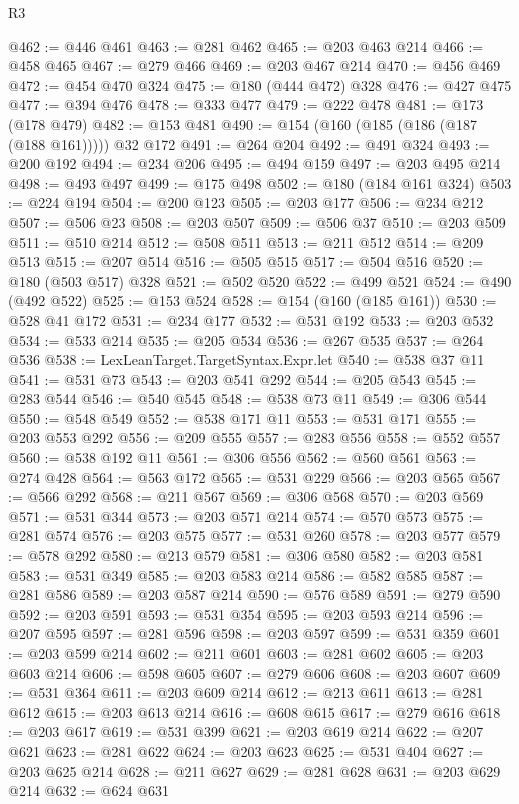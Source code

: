\begin{lexlean}{R3}
\begin{coremodule}
@462 := @446 @461
@463 := @281 @462
@465 := @203 @463 @214
@466 := @458 @465
@467 := @279 @466
@469 := @203 @467 @214
@470 := @456 @469
@472 := @454 @470 @324
@475 := @180 (@444 @472) @328
@476 := @427 @475
@477 := @394 @476
@478 := @333 @477
@479 := @222 @478
@481 := @173 (@178 @479)
@482 := @153 @481
@490 := @154 (@160 (@185 (@186 (@187 (@188 @161))))) @32 @172
@491 := @264 @204
@492 := @491 @324
@493 := @200 @192
@494 := @234 @206
@495 := @494 @159
@497 := @203 @495 @214
@498 := @493 @497
@499 := @175 @498
@502 := @180 (@184 @161 @324)
@503 := @224 @194
@504 := @200 @123
@505 := @203 @177
@506 := @234 @212
@507 := @506 @23
@508 := @203 @507
@509 := @506 @37
@510 := @203 @509
@511 := @510 @214
@512 := @508 @511
@513 := @211 @512
@514 := @209 @513
@515 := @207 @514
@516 := @505 @515
@517 := @504 @516
@520 := @180 (@503 @517) @328
@521 := @502 @520
@522 := @499 @521
@524 := @490 (@492 @522)
@525 := @153 @524
@528 := @154 (@160 (@185 @161))
@530 := @528 @41 @172
@531 := @234 @177
@532 := @531 @192
@533 := @203 @532
@534 := @533 @214
@535 := @205 @534
@536 := @267 @535
@537 := @264 @536
@538 := LexLeanTarget.TargetSyntax.Expr.let
@540 := @538 @37 @11
@541 := @531 @73
@543 := @203 @541 @292
@544 := @205 @543
@545 := @283 @544
@546 := @540 @545
@548 := @538 @73 @11
@549 := @306 @544
@550 := @548 @549
@552 := @538 @171 @11
@553 := @531 @171
@555 := @203 @553 @292
@556 := @209 @555
@557 := @283 @556
@558 := @552 @557
@560 := @538 @192 @11
@561 := @306 @556
@562 := @560 @561
@563 := @274 @428
@564 := @563 @172
@565 := @531 @229
@566 := @203 @565
@567 := @566 @292
@568 := @211 @567
@569 := @306 @568
@570 := @203 @569
@571 := @531 @344
@573 := @203 @571 @214
@574 := @570 @573
@575 := @281 @574
@576 := @203 @575
@577 := @531 @260
@578 := @203 @577
@579 := @578 @292
@580 := @213 @579
@581 := @306 @580
@582 := @203 @581
@583 := @531 @349
@585 := @203 @583 @214
@586 := @582 @585
@587 := @281 @586
@589 := @203 @587 @214
@590 := @576 @589
@591 := @279 @590
@592 := @203 @591
@593 := @531 @354
@595 := @203 @593 @214
@596 := @207 @595
@597 := @281 @596
@598 := @203 @597
@599 := @531 @359
@601 := @203 @599 @214
@602 := @211 @601
@603 := @281 @602
@605 := @203 @603 @214
@606 := @598 @605
@607 := @279 @606
@608 := @203 @607
@609 := @531 @364
@611 := @203 @609 @214
@612 := @213 @611
@613 := @281 @612
@615 := @203 @613 @214
@616 := @608 @615
@617 := @279 @616
@618 := @203 @617
@619 := @531 @399
@621 := @203 @619 @214
@622 := @207 @621
@623 := @281 @622
@624 := @203 @623
@625 := @531 @404
@627 := @203 @625 @214
@628 := @211 @627
@629 := @281 @628
@631 := @203 @629 @214
@632 := @624 @631

\end{coremodule}
\end{lexlean}
